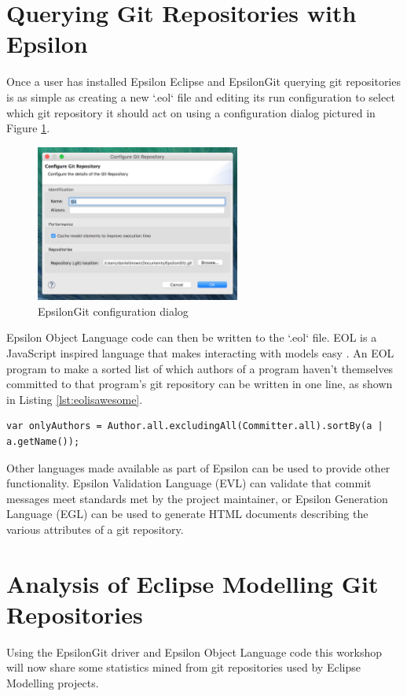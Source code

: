 \documentclass[runningheads,a4paper]{llncs}
\begin{document}
\section{Querying Git Repositories with Epsilon}
Once a user has installed Epsilon Eclipse and EpsilonGit querying git repositories is as simple as creating a new `.eol` file and editing its run configuration to select which git repository it should act on using a configuration dialog pictured in Figure \ref{fig:configurationdialog}.

\begin{figure}[h]
	\centering
	\includegraphics[width=0.6\textwidth]{../thesis/images/configurationdialog}
	\caption{EpsilonGit configuration dialog}
	\label{fig:configurationdialog}
\end{figure} 

Epsilon Object Language code can then be written to the `.eol` file. EOL is a JavaScript inspired language that makes interacting with models easy \cite{epsilonhomepage}. An EOL program to make a sorted list of which authors of a program haven't themselves committed to that program's git repository can be written in one line, as shown in Listing \ref{lst:eolisawesome}.

\begin{lstlisting}[caption=Author vs Committer Information, label=lst:eolisawesome]
var onlyAuthors = Author.all.excludingAll(Committer.all).sortBy(a | a.getName());
\end{lstlisting}

Other languages made available as part of Epsilon can be used to provide other functionality. Epsilon Validation Language (EVL) can validate that commit messages meet standards met by the project maintainer, or Epsilon Generation Language (EGL) can be used to generate HTML documents describing the various attributes of a git repository.

\section{Analysis of Eclipse Modelling Git Repositories}
Using the EpsilonGit driver and Epsilon Object Language code this workshop will now share some statistics mined from git repositories used by Eclipse Modelling projects.
\end{document}
